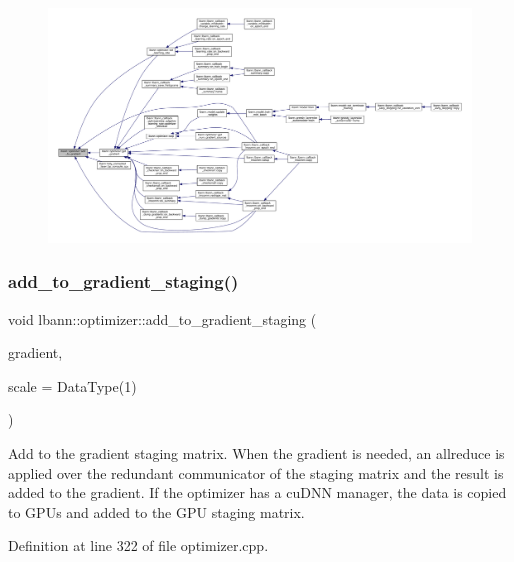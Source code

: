 \begin{figure}[H]
\begin{center}
\leavevmode
\includegraphics[width=350pt]{classlbann_1_1optimizer_a435d31e3b7a0302e36439ee36f62dba8_icgraph}
\end{center}
\end{figure}
\mbox{\label{classlbann_1_1optimizer_ac23ebde61a225f70c27ab937df5755ed}} 
\subsubsection{\texorpdfstring{add\+\_\+to\+\_\+gradient\+\_\+staging()}{add\_to\_gradient\_staging()}}
{\footnotesize\ttfamily void lbann\+::optimizer\+::add\+\_\+to\+\_\+gradient\+\_\+staging (\begin{DoxyParamCaption}\item[{const \hyperlink{base_8hpp_a9a697a504ae84010e7439ffec862b470}{Abs\+Dist\+Mat} \&}]{gradient,  }\item[{Data\+Type}]{scale = {\ttfamily DataType(1)} }\end{DoxyParamCaption})}

Add to the gradient staging matrix. When the gradient is needed, an allreduce is applied over the redundant communicator of the staging matrix and the result is added to the gradient. If the optimizer has a cu\+D\+NN manager, the data is copied to G\+P\+Us and added to the G\+PU staging matrix. 

Definition at line 322 of file optimizer.\+cpp.


